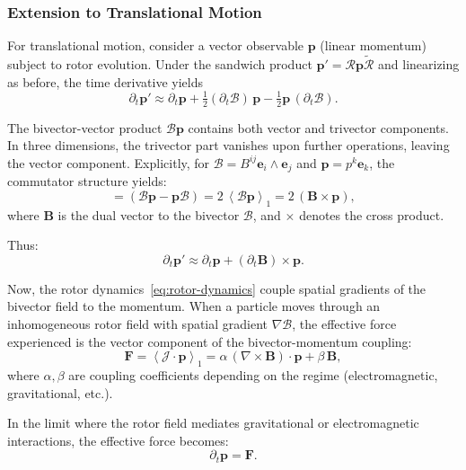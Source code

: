 \documentclass[11pt,a4paper]{article}
\newcommand{\e}{\mathbf{e}}
\newcommand{\grade}[2]{\left\langle #1 \right\rangle_{#2}}
\newcommand{\vecp}[1]{\grade{#1}{1}}
\newcommand{\rev}[1]{\widetilde{#1}}           %
\newcommand{\Rotor}{\mathcal{R}}
\newcommand{\Biv}{\mathcal{B}}
\theoremstyle{definition}
\theoremstyle{plain}
\theoremstyle{remark}
\begin{document}
\subsubsection{Extension to Translational Motion}

For translational motion, consider a vector observable $\mathbf{p}$ (linear momentum) subject to rotor evolution. Under the sandwich product $\mathbf{p}' = \Rotor \mathbf{p} \rev{\Rotor}$ and linearizing as before, the time derivative yields
\begin{equation}
\partial_t \mathbf{p}' \approx \partial_t \mathbf{p} + \tfrac{1}{2}(\partial_t\Biv)\, \mathbf{p} - \tfrac{1}{2}\mathbf{p}\,(\partial_t\Biv).
\end{equation}

The bivector-vector product $\Biv \mathbf{p}$ contains both vector and trivector components. In three dimensions, the trivector part vanishes upon further operations, leaving the vector component. Explicitly, for $\Biv = B^{ij}\e_i\wedge\e_j$ and $\mathbf{p} = p^k\e_k$, the commutator structure yields:
\begin{equation}
[\Biv, \mathbf{p}] = (\Biv\mathbf{p} - \mathbf{p}\Biv) = 2\,\vecp{\Biv \mathbf{p}} = 2\,(\mathbf{B} \times \mathbf{p}),
\end{equation}
where $\mathbf{B}$ is the dual vector to the bivector $\Biv$, and $\times$ denotes the cross product.

Thus:
\begin{equation}
\partial_t \mathbf{p}' \approx \partial_t \mathbf{p} + (\partial_t\mathbf{B}) \times \mathbf{p}.
\end{equation}

Now, the rotor dynamics~\eqref{eq:rotor-dynamics} couple spatial gradients of the bivector field to the momentum. When a particle moves through an inhomogeneous rotor field with spatial gradient $\nabla\Biv$, the effective force experienced is the vector component of the bivector-momentum coupling:
\begin{equation}
\mathbf{F} = \vecp{\mathcal{J} \cdot \mathbf{p}} = \alpha\,(\nabla \times \mathbf{B}) \cdot \mathbf{p} + \beta\,\mathbf{B},
\end{equation}
where $\alpha, \beta$ are coupling coefficients depending on the regime (electromagnetic, gravitational, etc.).

In the limit where the rotor field mediates gravitational or electromagnetic interactions, the effective force becomes:
\begin{equation}
\partial_t \mathbf{p} = \mathbf{F}.
\label{eq:newton-translational}
\end{equation}
\end{document}
